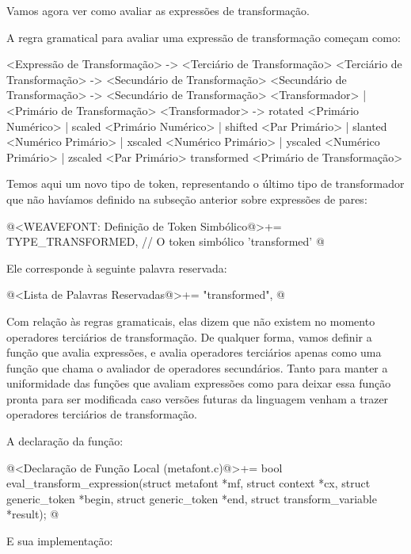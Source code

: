 Vamos agora ver como avaliar as expressões de transformação.


A regra gramatical para avaliar uma expressão de transformação começam
como:

\alinhaverbatim
<Expressão de Transformação> -> <Terciário de Transformação>
<Terciário de Transformação> -> <Secundário de Transformação>
<Secundário de Transformação> -> <Secundário de Transformação> <Transformador> |
                                 <Primário de Transformação>
<Transformador> -> rotated <Primário Numérico> |
                   scaled <Primário Numérico> |
                   shifted <Par Primário> |
                   slanted <Numérico Primário> |
                   xscaled <Numérico Primário> |
                   yscaled <Numérico Primário> |
                   zscaled <Par Primário>
                   transformed <Primário de Transformação>
\alinhanormal

Temos aqui um novo tipo de token, representando o último tipo de
transformador que não havíamos definido na subseção anterior sobre
expressões de pares:

\iniciocodigo
@<WEAVEFONT: Definição de Token Simbólico@>+=
TYPE_TRANSFORMED,  // O token simbólico 'transformed'
@
\fimcodigo

Ele corresponde à seguinte palavra reservada:

\iniciocodigo
@<Lista de Palavras Reservadas@>+=
"transformed",
@
\fimcodigo

Com relação às regras gramaticais, elas dizem que não existem no
momento operadores terciários de transformação. De qualquer forma,
vamos definir a função que avalia expressões, e avalia operadores
terciários apenas como uma função que chama o avaliador de operadores
secundários. Tanto para manter a uniformidade das funções que avaliam
expressões como para deixar essa função pronta para ser modificada
caso versões futuras da linguagem venham a trazer operadores
terciários de transformação.

A declaração da função:

\iniciocodigo
@<Declaração de Função Local (metafont.c)@>+=
bool eval_transform_expression(struct metafont *mf, struct context *cx,
                               struct generic_token *begin,
                               struct generic_token *end,
                               struct transform_variable *result);
@
\fimcodigo

E sua implementação:

